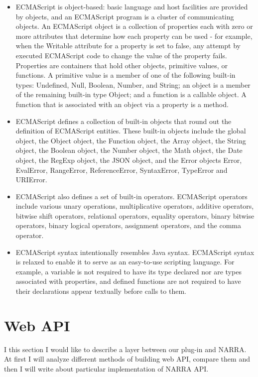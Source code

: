 \documentclass[thesis=B,english]{FITthesis}[2012/10/20]
\begin{document}
	\begin{itemize}
\item ECMAScript is object-based: basic language and host facilities are provided by objects, and an ECMAScript program is a cluster of communicating objects. An ECMAScript object is a collection of properties each with zero or more attributes that determine how each property can be used - for example, when the Writable attribute for a property is set to false, any attempt by executed ECMAScript code to change the value of the property fails. Properties are containers that hold other objects, primitive values, or functions. A primitive value is a member of one of the following built-in types: Undefined, Null, Boolean, Number, and String; an object is a member of the remaining built-in type Object; and a function is a callable object. A function that is associated with an object via a property is a method.
\item ECMAScript defines a collection of built-in objects that round out the definition of ECMAScript entities. These built-in objects include the global object, the Object object, the Function object, the Array object, the String object, the Boolean object, the Number object, the Math object, the Date object, the RegExp object, the JSON object, and the Error objects Error, EvalError, RangeError, ReferenceError, SyntaxError, TypeError and URIError.
\item ECMAScript also defines a set of built-in operators. ECMAScript operators include various unary operations, multiplicative operators, additive operators, bitwise shift operators, relational operators, equality operators, binary bitwise operators, binary logical operators, assignment operators, and the comma operator.
\item ECMAScript syntax intentionally resembles Java syntax. ECMAScript syntax is relaxed to enable it to serve as an easy-to-use scripting language. For example, a variable is not required to have its type declared nor are types associated with properties, and defined functions are not required to have their declarations appear textually before calls to them.\cite{ecma}
	\end{itemize}

\section{Web API}
I this section I would like to describe a layer between our plug-in and NARRA. At first I will analyze different methods of building web API, compare them and then I will write about particular implementation of NARRA API.
\end{document}
